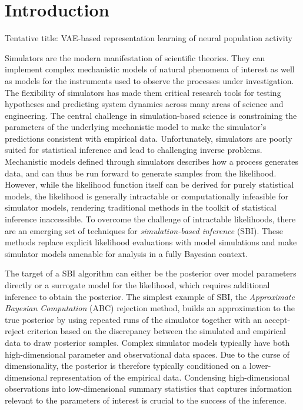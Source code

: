 \section{Introduction}\label{sec:Introduction}

Tentative title: VAE-based representation learning of neural population activity

Simulators are the modern manifestation of scientific theories. They can implement complex mechanistic models of natural phenomena of interest as well as models for the instruments used to observe the processes under investigation. The flexibility of simulators has made them critical research tools for testing hypotheses and predicting system dynamics across many areas of science and engineering. The central challenge in simulation-based science is constraining the parameters of the underlying mechanistic model to make the simulator's predictions consistent with empirical data. Unfortunately, simulators are poorly suited for statistical inference and lead to challenging inverse problems. Mechanistic models defined through simulators describes how a process generates data, and can thus be run forward to generate samples from the likelihood. However, while the likelihood function itself can be derived for purely statistical models, the likelihood is generally intractable or computationally infeasible for simulator models, rendering traditional methods in the toolkit of statistical inference inaccessible. To overcome the challenge of intractable likelihoods, there are an emerging set of techniques for \textit{simulation-based inference} (SBI). These methods replace explicit likelihood evaluations with model simulations and make simulator models amenable for analysis in a fully Bayesian context.

The target of a SBI algorithm can either be the posterior over model parameters directly or a surrogate model for the likelihood, which requires additional inference to obtain the posterior. The simplest example of SBI, the \textit{Approximate Bayesian Computation} (ABC) rejection method, builds an approximation to the true posterior by using repeated runs of the simulator together with an accept-reject criterion based on the discrepancy between the simulated and empirical data to draw posterior samples. Complex simulator models typically have both high-dimensional parameter and observational data spaces. Due to the curse of dimensionality, the posterior is therefore typically conditioned on a lower-dimensional representation of the empirical data. Condensing high-dimensional observations into low-dimensional summary statistics that captures information relevant to the parameters of interest is crucial to the success of the inference.

